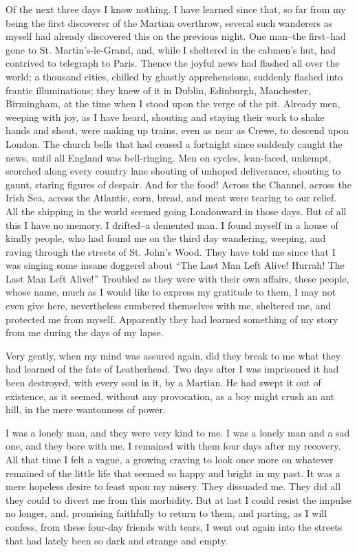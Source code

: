 Of the next three days I know nothing. I have learned since that,
so far from my being the first discoverer of the Martian overthrow,
several such wanderers as myself had already discovered this on the
previous night. One man--the first--had gone to St.
Martin's-le-Grand, and, while I sheltered in the cabmen's hut, had
contrived to telegraph to Paris. Thence the joyful news had flashed
all over the world; a thousand cities, chilled by ghastly
apprehensions, suddenly flashed into frantic illuminations; they
knew of it in Dublin, Edinburgh, Manchester, Birmingham, at the
time when I stood upon the verge of the pit. Already men, weeping
with joy, as I have heard, shouting and staying their work to shake
hands and shout, were making up trains, even as near as Crewe, to
descend upon London. The church bells that had ceased a fortnight
since suddenly caught the news, until all England was bell-ringing.
Men on cycles, lean-faced, unkempt, scorched along every country
lane shouting of unhoped deliverance, shouting to gaunt, staring
figures of despair. And for the food! Across the Channel, across
the Irish Sea, across the Atlantic, corn, bread, and meat were
tearing to our relief. All the shipping in the world seemed going
Londonward in those days. But of all this I have no memory. I
drifted--a demented man. I found myself in a house of kindly
people, who had found me on the third day wandering, weeping, and
raving through the streets of St. John's Wood. They have told me
since that I was singing some insane doggerel about ``The Last Man
Left Alive! Hurrah! The Last Man Left Alive!'' Troubled as they were
with their own affairs, these people, whose name, much as I would
like to express my gratitude to them, I may not even give here,
nevertheless cumbered themselves with me, sheltered me, and
protected me from myself. Apparently they had learned something of
my story from me during the days of my lapse.

Very gently, when my mind was assured again, did they break to me
what they had learned of the fate of Leatherhead. Two days after I
was imprisoned it had been destroyed, with every soul in it, by a
Martian. He had swept it out of existence, as it seemed, without
any provocation, as a boy might crush an ant hill, in the mere
wantonness of power.

I was a lonely man, and they were very kind to me. I was a lonely
man and a sad one, and they bore with me. I remained with them four
days after my recovery. All that time I felt a vague, a growing
craving to look once more on whatever remained of the little life
that seemed so happy and bright in my past. It was a mere hopeless
desire to feast upon my misery. They dissuaded me. They did all
they could to divert me from this morbidity. But at last I could
resist the impulse no longer, and, promising faithfully to return
to them, and parting, as I will confess, from these four-day
friends with tears, I went out again into the streets that had
lately been so dark and strange and empty.

